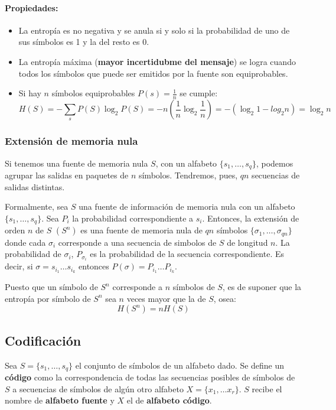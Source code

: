 \paragraph{Propiedades:}
\begin{itemize}
  \item La entropía es no negativa y se anula si y solo si la probabilidad de uno de sus símbolos es 1 y la del resto es 0.
  \item La entropía máxima (\textbf{mayor incertidubme del mensaje}) se logra cuando todos los símbolos que puede ser emitidos por la fuente son equiprobables.
    \item Si hay \(n\) símbolos equiprobables \(P(s)=\frac{1}{n}\) se cumple:
    \[
      H(S) = -\sum_s P(S)\log_2 P(S) = -n(\frac{1}{n}\log_2\frac{1}{n}) = -(\log_2 1 - log_2 n) = \log_2 n
    \]
\end{itemize}

\subsubsection{Extensión de memoria nula}
Si tenemos una fuente de memoria nula \(S\), con un alfabeto \(\{s_1,\dots,s_q\}\), podemos agrupar las salidas en paquetes de \(n\) símbolos. Tendremos, pues, \(qn\) secuencias de salidas distintas. 

Formalmente, sea \(S\) una fuente de información de memoria nula con un alfabeto \(\{s_1,\dots,s_q\}\). Sea \(P_i\) la probabilidad correspondiente a \(s_i\). Entonces, la extensión de orden \(n\) de \(S\) \((S^n)\) es una fuente de memoria nula de \(qn\) símbolos \(\{\sigma_1,\dots,\sigma_{qn}\}\) donde cada \(\sigma_i\) corresponde a una secuencia de simbolos de \(S\) de longitud \(n\). La probabilidad de \(\sigma_i\), \(P_{\sigma_i}\) es la probabilidad de la secuencia correspondiente. Es decir, si \(\sigma = s_{i_1}\dots s_{i_k}\) entonces \(P(\sigma) = P_{i_1}\dots P_{i_k}\).

Puesto que un símbolo de \(S^n\) corresponde a \(n\) símbolos de \(S\), es de suponer que la entropía por símbolo de \(S^n\) sea \(n\) veces mayor que la de \(S\), osea:
\[H(S^n) = nH(S)\]

\subsection{Codificación}
Sea \(S = \{ s_1,\dots, s_q\} \) el conjunto de símbolos de un alfabeto dado. Se define un \textbf{código} como la correspondencia de todas las secuencias posibles de símbolos de \(S\) a secuencias de símbolos de algún otro alfabeto \(X =\{x_1,\dots x_r\}\). \(S\) recibe el nombre de \textbf{alfabeto fuente} y \(X\) el de \textbf{alfabeto código}.

